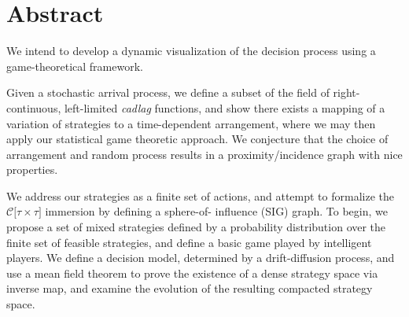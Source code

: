 \section*{Abstract}

We intend to develop a
dynamic visualization of the decision process using a game-theoretical
framework.

Given a stochastic arrival process, we define a subset of the field of
right-continuous, left-limited \emph{cadlag} 
functions, and show there exists a mapping of a variation of strategies to a time-dependent
arrangement, where we may then apply our statistical game theoretic approach.
We conjecture that the choice of arrangement and random process results in a
proximity/incidence graph with nice properties.

We address our strategies as a finite set of actions, and attempt to formalize
the $\mathcal{C}\lbrack\tau \times \tau\rbrack$ immersion by defining a sphere-of-
influence (SIG) graph. To begin, we propose a set of mixed strategies defined by a probability
distribution over the finite set of feasible strategies, and define a basic game
played by intelligent players.
We define a decision model, determined by a drift-diffusion process, and use a mean field theorem to prove the existence of a dense strategy
space via inverse map, and examine the evolution of the resulting compacted strategy space. 

\vspace{2cm}

